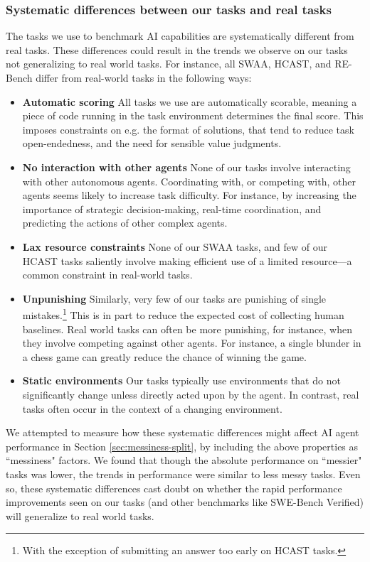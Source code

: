 \documentclass{article}
\newcommand{\gabenchmark}{HCAST}
\begin{document}
\subsubsection{Systematic differences between our tasks and real tasks}

The tasks we use to benchmark AI capabilities are systematically different from real tasks. These differences could result in the trends we observe on our tasks not generalizing to real world tasks. For instance, all SWAA, \gabenchmark{}, and RE-Bench differ from real-world tasks in the following ways:
\begin{itemize}
    \item \textbf{Automatic scoring} All tasks we use are automatically scorable, meaning a piece of code running in the task environment determines the final score. This imposes constraints on e.g. the format of solutions, that tend to reduce task open-endedness, and the need for sensible value judgments. 
    \item \textbf{No interaction with other agents} None of our tasks involve interacting with other autonomous agents. Coordinating with, or competing with, other agents seems likely to increase task difficulty. For instance, by increasing the importance of strategic decision-making, real-time coordination, and predicting the actions of other complex agents.
    \item \textbf{Lax resource constraints} None of our SWAA tasks, and few of our \gabenchmark{} tasks saliently involve making efficient use of a limited resource---a common constraint in real-world tasks.
    \item \textbf{Unpunishing} Similarly, very few of our tasks are punishing of single mistakes.\footnote{With the exception of submitting an answer too early on \gabenchmark{} tasks.} This is in part to reduce the expected cost of collecting human baselines. Real world tasks can often be more punishing, for instance, when they involve competing against other agents. For instance, a single blunder in a chess game can greatly reduce the chance of winning the game. 
    \item \textbf{Static environments} Our tasks typically use environments that do not significantly change unless directly acted upon by the agent. In contrast, real tasks often occur in the context of a changing environment.
\end{itemize}

We attempted to measure how these systematic differences might affect AI agent performance in Section \ref{sec:messiness-split}, by including the above properties as ``messiness" factors. We found that though the absolute performance on ``messier" tasks was lower, the trends in performance were similar to less messy tasks. Even so, these systematic differences cast doubt on whether the rapid performance improvements seen on our tasks (and other benchmarks like SWE-Bench Verified) will generalize to real world tasks. 
\end{document}
